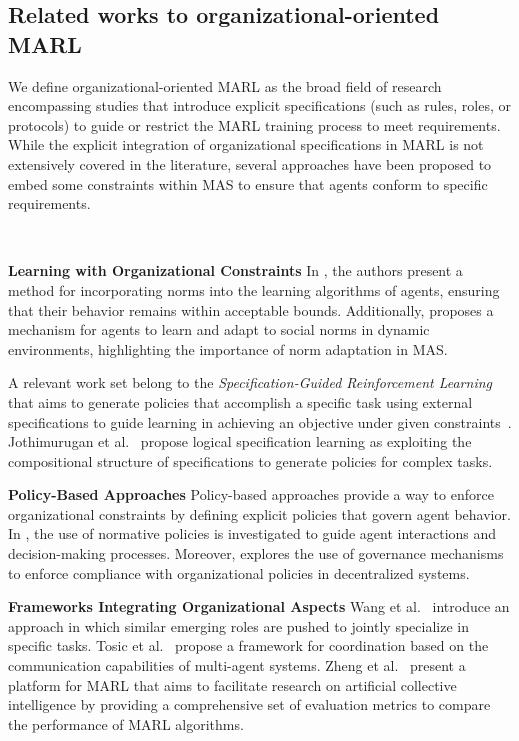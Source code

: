\documentclass[conference]{IEEEtran}
\begin{document}
\subsection{Related works to organizational-oriented MARL}


We define organizational-oriented MARL as the broad field of research encompassing studies that introduce explicit specifications (such as rules, roles, or protocols) to guide or restrict the MARL training process to meet requirements. While the explicit integration of organizational specifications in MARL is not extensively covered in the literature, several approaches have been proposed to embed some constraints within MAS to ensure that agents conform to specific requirements.

\

\textbf{Learning with Organizational Constraints} \quad
%
In \cite{cruz2020norms}, the authors present a method for incorporating norms into the learning algorithms of agents, ensuring that their behavior remains within acceptable bounds. Additionally, \cite{villatoro2011social} proposes a mechanism for agents to learn and adapt to social norms in dynamic environments, highlighting the importance of norm adaptation in MAS.

A relevant work set belong to the \emph{Specification-Guided Reinforcement Learning} that aims to generate policies that accomplish a specific task using external specifications to guide learning in achieving an objective under given constraints~\cite{Bansal2022}. Jothimurugan et al.~\cite{Jothimurugan2021} propose logical specification learning as exploiting the compositional structure of specifications to generate policies for complex tasks.

\textbf{Policy-Based Approaches} \quad
%
Policy-based approaches provide a way to enforce organizational constraints by defining explicit policies that govern agent behavior. In \cite{krupanski2015norm}, the use of normative policies is investigated to guide agent interactions and decision-making processes. Moreover, \cite{vos2020governing} explores the use of governance mechanisms to enforce compliance with organizational policies in decentralized systems.

\textbf{Frameworks Integrating Organizational Aspects} \quad
%
Wang et al.~\cite{Wang2020} introduce an approach in which similar emerging roles are pushed to jointly specialize in specific tasks. Tosic et al.~\cite{Tosic2010} propose a framework for coordination based on the communication capabilities of multi-agent systems. Zheng et al.~\cite{Zheng2018} present a platform for MARL that aims to facilitate research on artificial collective intelligence by providing a comprehensive set of evaluation metrics to compare the performance of MARL algorithms.
\end{document}
